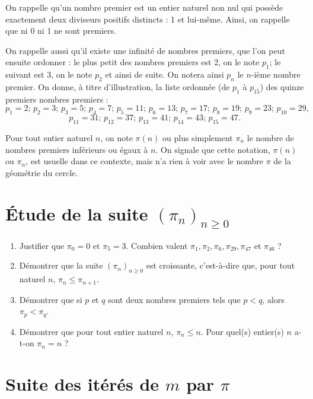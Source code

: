 On rappelle qu’un nombre premier est un entier naturel non nul qui possède exactement deux diviseurs positifs distincts : 1 et lui-même. Ainsi, on rappelle que ni 0 ni 1 ne sont premiers.

On rappelle aussi qu’il existe une infinité de nombres premiers, que l’on peut ensuite ordonner : le plus petit des nombres premiers est 2, on le note \( p_1 \); le suivant est 3, on le note \( p_2 \) et ainsi de suite. On notera ainsi \( p_n \) le \( n \)-ième nombre premier. On donne, à titre d’illustration, la liste ordonnée (de \( p_1 \) à \( p_{15} \)) des quinze premiers nombres premiers :
\[
p_1 = 2; \, p_2 = 3; \, p_3 = 5; \, p_4 = 7; \, p_5 = 11; \, p_6 = 13; \, p_7 = 17; \, p_8 = 19; \, p_9 = 23; \, p_{10} = 29,
\]
\[
p_{11} = 31; \, p_{12} = 37; \, p_{13} = 41; \, p_{14} = 43; \, p_{15} = 47.
\]

Pour tout entier naturel \( n \), on note \( \pi(n) \) ou plus simplement \( \pi_n \) le nombre de nombres premiers inférieurs ou égaux à \( n \). On signale que cette notation, \( \pi(n) \) ou \( \pi_n \), est usuelle dans ce contexte, mais n’a rien à voir avec le nombre \( \pi \) de la géométrie du cercle.

\section*{Étude de la suite \( (\pi_n)_{n \geqslant 0} \)}

\begin{enumerate}
\item Justifier que \( \pi_0 = 0 \) et \( \pi_5 = 3 \). Combien valent \( \pi_1, \pi_2, \pi_6, \pi_{29}, \pi_{47} \) et \( \pi_{46} \) ?
\item Démontrer que la suite \( (\pi_n)_{n \geqslant 0} \) est croissante, c’est-à-dire que, pour tout naturel \( n \), \( \pi_n \leqslant \pi_{n+1} \).
\item Démontrer que si \( p \) et \( q \) sont deux nombres premiers tels que \( p < q \), alors \( \pi_p < \pi_q \).
\item Démontrer que pour tout entier naturel \( n \), \( \pi_n \leqslant n \). Pour quel(s) entier(s) \( n \) a-t-on \( \pi_n = n \) ?
\end{enumerate}

\section*{Suite des itérés de \( m \) par \( \pi \)}

